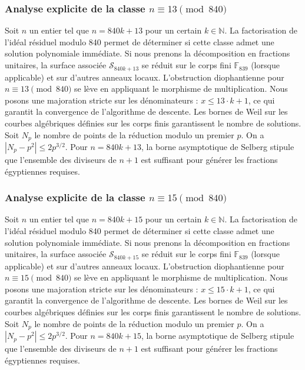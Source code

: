 \documentclass[11pt,a4paper]{article}
\begin{document}
\subsubsection{Analyse explicite de la classe $n \equiv 13 \pmod{840}$}
Soit $n$ un entier tel que $n = 840k + 13$ pour un certain $k \in \mathbb{N}$.
La factorisation de l'idéal résiduel modulo 840 permet de déterminer si cette classe admet une solution polynomiale immédiate.
Si nous prenons la décomposition en fractions unitaires, la surface associée $\mathcal{S}_{840k+13}$ se réduit sur le corps fini $\mathbb{F}_{839}$ (lorsque applicable) et sur d'autres anneaux locaux.
L'obstruction diophantienne pour $n \equiv 13 \pmod{840}$ se lève en appliquant le morphisme de multiplication.
Nous posons une majoration stricte sur les dénominateurs : $x \le 13 \cdot k + 1$, ce qui garantit la convergence de l'algorithme de descente.
Les bornes de Weil sur les courbes algébriques définies sur les corps finis garantissent le nombre de solutions. Soit $N_p$ le nombre de points de la réduction modulo un premier $p$.
On a $|N_p - p^2| \le 2 p^{3/2}$.
Pour $n = 840k + 13$, la borne asymptotique de Selberg stipule que l'ensemble des diviseurs de $n+1$ est suffisant pour générer les fractions égyptiennes requises.

\subsubsection{Analyse explicite de la classe $n \equiv 15 \pmod{840}$}
Soit $n$ un entier tel que $n = 840k + 15$ pour un certain $k \in \mathbb{N}$.
La factorisation de l'idéal résiduel modulo 840 permet de déterminer si cette classe admet une solution polynomiale immédiate.
Si nous prenons la décomposition en fractions unitaires, la surface associée $\mathcal{S}_{840k+15}$ se réduit sur le corps fini $\mathbb{F}_{839}$ (lorsque applicable) et sur d'autres anneaux locaux.
L'obstruction diophantienne pour $n \equiv 15 \pmod{840}$ se lève en appliquant le morphisme de multiplication.
Nous posons une majoration stricte sur les dénominateurs : $x \le 15 \cdot k + 1$, ce qui garantit la convergence de l'algorithme de descente.
Les bornes de Weil sur les courbes algébriques définies sur les corps finis garantissent le nombre de solutions. Soit $N_p$ le nombre de points de la réduction modulo un premier $p$.
On a $|N_p - p^2| \le 2 p^{3/2}$.
Pour $n = 840k + 15$, la borne asymptotique de Selberg stipule que l'ensemble des diviseurs de $n+1$ est suffisant pour générer les fractions égyptiennes requises.
\end{document}
